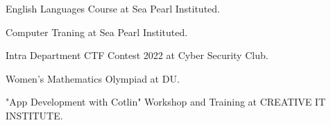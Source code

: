 \documentclass[11pt]{spidercv}
\begin{document}
\begin{MainPart}
    \vspace*{0.2cm}  
    \vspace*{0.1cm}
        \begin{ItemList}{\ColorHighlight} 
            \item[] English Languages Course at Sea Pearl Instituted. 
            \item[] Computer Traning at Sea Pearl Instituted. 
            \item[] Intra Department CTF Contest 2022 at Cyber Security Club.
            \item[] Women's Mathematics Olympiad at DU.
            \item[] "App Development with Cotlin" Workshop and Training at  CREATIVE IT\\ INSTITUTE.
            
        \end{ItemList}
            

    \end{MainPart}

    
\end{document}
